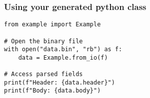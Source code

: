 \begin{frame}[fragile]
\frametitle{Using your generated python class}

\begin{lstlisting}
from example import Example

# Open the binary file
with open("data.bin", "rb") as f:
    data = Example.from_io(f)

# Access parsed fields
print(f"Header: {data.header}")
print(f"Body: {data.body}")
\end{lstlisting}
\end{frame}
